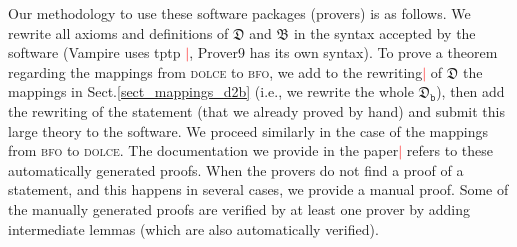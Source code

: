 \documentclass[ao]{iosart2x}
\newcommand{\nb}[1]{\textcolor{red}{$|$}\marginpar{\hspace*{-0cm}\parbox{20mm}{\scriptsize\raggedright\textcolor{red}{#1}}}}
\newcommand{\dolce}{{\textsc{dolce}}}
\newcommand{\bfo}{{\textsc{bfo}}}
\newcommand {\thdolce} {\ensuremath{\mathfrak{D}}}
\newcommand {\thbfo} {\ensuremath{\mathfrak{B}}}
\newcommand {\thdolcedbmap} {\ensuremath{\mathfrak{D}_\texttt{b}}}
\begin{document}

Our methodology to use these software packages (provers) is as follows. We rewrite all axioms and definitions of {$\thdolce$} and $\thbfo$ in the syntax accepted by the software (Vampire uses tptp \citep{Sut17}\nb{CM: saltato riferimento, @Francesco, puoi aggiungre?}, Prover9 has its own syntax).
To prove a theorem regarding the mappings from {\dolce} to {\bfo}, we add to the rewriting\nb{CM: non ho capito di che rewriting si tratta} of $\thdolce$ the mappings in Sect.\ref{sect_mappings_d2b} (i.e., we rewrite the whole $\thdolcedbmap$), then add the rewriting of the statement (that we already proved by hand) and submit this large theory to the software. We proceed similarly in the case of the mappings from {\bfo} to {\dolce}. The documentation we provide in the paper\nb{CM: che cosa sarebbe?} refers to these automatically generated proofs.
When the provers do not find a proof of a statement, and this happens in several cases, we provide a manual proof. Some of the manually generated proofs are verified by at least one prover by adding intermediate lemmas (which are also automatically verified). %
\end{document}
